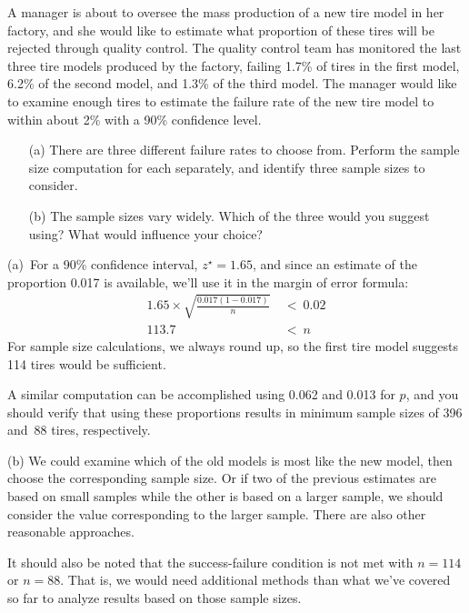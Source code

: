 \begin{example}{A manager is about to oversee the mass production of a new tire model in her factory, and she would like to estimate what proportion of these tires will be rejected through quality control. The quality control team has monitored the last three tire models produced by the factory, failing 1.7\% of tires in the first model, 6.2\% of the second model, and 1.3\% of the third model. The manager would like to examine enough tires to estimate the failure rate of the new tire model to within about 2\% with a 90\% confidence level.
\begin{enumerate}
\setlength{\itemsep}{0mm}
\item[(a)] There are three different failure rates to choose from. Perform the sample size computation for each separately, and identify three sample sizes to consider.
\item[(b)] The sample sizes vary widely. Which of the three would you suggest using? What would influence your choice?
\end{enumerate}}
(a)~For a 90\% confidence interval, $z^{\star} = 1.65$, and since an estimate of the proportion 0.017 is available, we'll use it in the margin of error formula: %
\begin{align*}
1.65\times \sqrt{\frac{0.017(1-0.017)}{n}} &\ < \ 0.02 \\
113.7 &\ < \ n
\end{align*}
For sample size calculations, we always round up, so the first tire model suggests 114 tires would be sufficient.

A similar computation can be accomplished using 0.062 and 0.013 for $p$, and you should verify that using these proportions results in minimum sample sizes of 396 and~88 tires, respectively.

(b) We could examine which of the old models is most like the new model, then choose the corresponding sample size. Or if two of the previous estimates are based on small samples while the other is based on a larger sample, we should consider the value corresponding to the larger sample. There are also other reasonable approaches.

It should also be noted that the success-failure condition is not met with $n = 114$ or $n = 88$. That is, we would need additional methods than what we've covered so far to analyze results based on those sample sizes.
\end{example}

